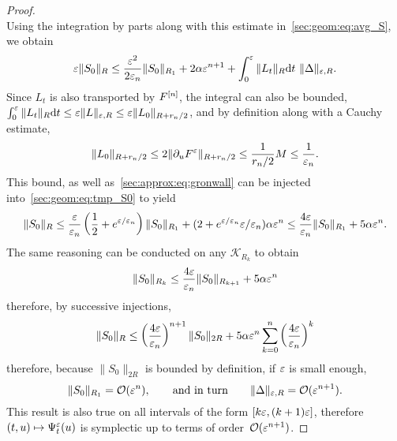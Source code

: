 \begin{proof}
\begin{equation*}
\end{equation*}
Using the integration by parts along with this estimate
in~\eqref{sec:geom:eq:avg_S}, we obtain
\begin{equation*} \label{sec:geom:eq:tmp_S0}
  \varepsilon \| S_0 \|_R
  \leq \frac{\varepsilon^2}{2\varepsilon_n}\| S_0 \|_{R_1}
    + 2\alpha \varepsilon^{n+1} 
    + \int_0^\varepsilon \|L_t\|_{R} \mathrm{d} t \ \| \Delta \|_{\varepsilon, R} .
\end{equation*}
Since $L_t$ is also transported by $F^{[n]}$, the integral can also be
bounded, $\int_0^\varepsilon \| L_t \|_R \mathrm{d} t \leq \varepsilon \| L \|_{\varepsilon, R} \leq
\varepsilon \| L_0 \|_{R + r_n/2}$, and by definition along with a Cauchy
estimate, 
\begin{equation*}
  \| L_0 \| _{R + r_n/2} 
  \leq 2 \| \partial_u F^\varepsilon \|_{R + r_n/2}
  \leq \frac{1}{r_n/2} M \leq \frac{1}{\varepsilon_n} .
\end{equation*}
This bound, as well as~\eqref{sec:approx:eq:gronwall} can be injected
into~\eqref{sec:geom:eq:tmp_S0} to yield 
\begin{equation*}
  \| S_0 \|_R
  \leq \frac{\varepsilon}{\varepsilon_n} \left(
    \frac{1}{2} + e^{\varepsilon/\varepsilon_n} 
  \right) \| S_0 \|_{R_1} 
  + (2 + e^{\varepsilon/\varepsilon_n}\varepsilon/\varepsilon_n) \alpha \varepsilon^n
  \leq \frac{4\varepsilon}{\varepsilon_n} \| S_0 \|_{R_1} + 5\alpha \varepsilon^n .
\end{equation*}
The same reasoning can be conducted on any $\mathcal{K}_{R_k}$ to obtain
\begin{equation*}
  \| S_0 \| _{R_k} 
  \leq \frac{4\varepsilon}{\varepsilon_n} \| S_0 \|_{R_{k+1}} + 5\alpha \varepsilon^n
\end{equation*}
therefore, by successive injections,
\begin{equation*}
  \| S_0 \| _R \leq \left( \frac{4\varepsilon}{\varepsilon_n} \right)^{n+1} \|S_0\| _{2R}
  + 5\alpha \varepsilon^n \sum_{k = 0}^n \left(\frac{4\varepsilon}{\varepsilon_n}\right)^k
\end{equation*}
therefore, because $\| S_0 \|_{2R}$ is bounded by definition, if $\varepsilon$
is small enough, 
\begin{equation*}
  \| S_0 \|_{R_1} = \mathcal{O}(\varepsilon^n),
  \qquad\text{and in turn}\qquad
  \| \Delta \|_{\varepsilon, R} = \mathcal{O}(\varepsilon^{n+1}) .
\end{equation*}
This result is also true on all intervals of the form $[k\varepsilon,
(k+1)\varepsilon]$, therefore $(t,u) \mapsto \Psi^\varepsilon _t(u)$ is symplectic up
to terms of order~$\mathcal{O}(\varepsilon^{n+1})$. 

\end{proof}